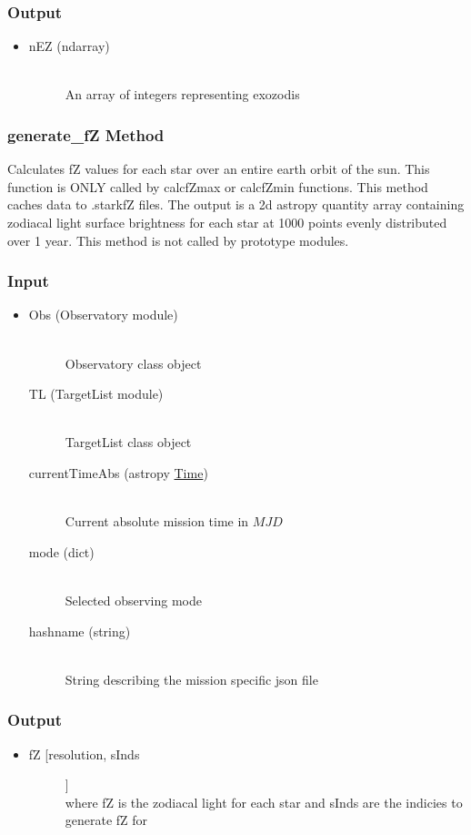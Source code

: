 \documentclass[cleanfoot]{asme2ej}
\begin{document}
\subsubsection*{Output}
\begin{itemize}
\item 
\begin{description}
    \item[nEZ (ndarray)] \hfill \\ An array of integers representing exozodis
\end{description}
\end{itemize}

\subsubsection{generate\_fZ Method} \label{sec:generatefZtask}
Calculates fZ values for each star over an entire earth orbit of the sun. This function is ONLY called by calcfZmax or calcfZmin functions. This method caches data to .starkfZ files. The output is a 2d astropy quantity array containing zodiacal light surface brightness for each star at 1000 points evenly distributed over 1 year. This method is not called by prototype modules.
\subsubsection*{Input}
\begin{itemize}
\item
\begin{description}
    \item[Obs (Observatory module)] \hfill \\ Observatory class object
    \item[TL (TargetList module)] \hfill \\ TargetList class object
    \item[currentTimeAbs (astropy \href{http://astropy.readthedocs.org/en/latest/time/index.html}{Time})] \hfill \\ Current absolute mission time in $ MJD $
    \item[mode (dict)] \hfill \\ Selected observing mode
    \item[hashname (string)] \hfill \\ String describing the mission specific json file
\end{description}
\end{itemize}
\subsubsection*{Output}
\begin{itemize}
\item
\begin{description}
    \item[fZ [resolution, sInds]] \hfill \\ where fZ is the zodiacal light for each star and sInds are the indicies to generate fZ for
\end{description}
\end{itemize}
\end{document}

